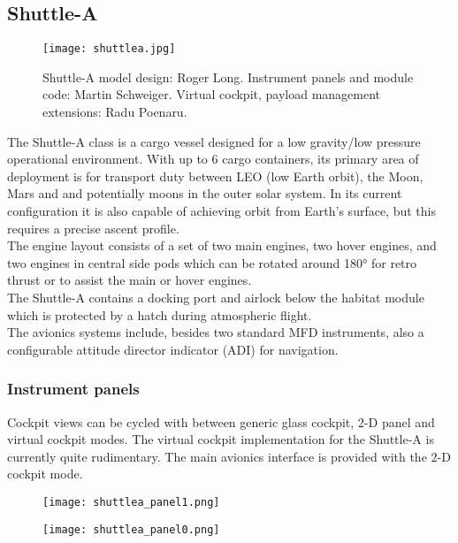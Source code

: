 \documentclass[Orbiter User Manual.tex]{subfiles}
\begin{document}
\subsection{Shuttle-A}

\begin{figure}[H]
  \centering
  \texttt{[image: shuttlea.jpg]}
  \caption{Shuttle-A model design: Roger Long. Instrument panels and module code: Martin Schweiger. Virtual cockpit, payload management extensions: Radu Poenaru.}
\end{figure}

\noindent
The Shuttle-A class is a cargo vessel designed for a low gravity/low pressure operational environment. With up to 6 cargo containers, its primary area of deployment is for transport duty between LEO (low Earth orbit), the Moon, Mars and and potentially moons in the outer solar system. In its current configuration it is also capable of achieving orbit from Earth's surface, but this requires a precise ascent profile.\\
The engine layout consists of a set of two main engines, two hover engines, and two engines in central side pods which can be rotated around 180° for retro thrust or to assist the main or hover engines.\\
The Shuttle-A contains a docking port and airlock below the habitat module which is protected by a hatch during atmospheric flight.\\
The avionics systems include, besides two standard MFD instruments, also a configurable attitude director indicator (ADI) for navigation.

\subsubsection{Instrument panels}
Cockpit views can be cycled with  between generic glass cockpit, 2-D panel and virtual cockpit modes. The virtual cockpit implementation for the Shuttle-A is currently quite rudimentary. The main avionics interface is provided with the 2-D cockpit mode.

\begin{figure}[H]
  \centering
  \texttt{[image: shuttlea\_panel1.png]}
\end{figure}

\begin{figure}[H]
  \centering
  \texttt{[image: shuttlea\_panel0.png]}
\end{figure}
\end{document}
